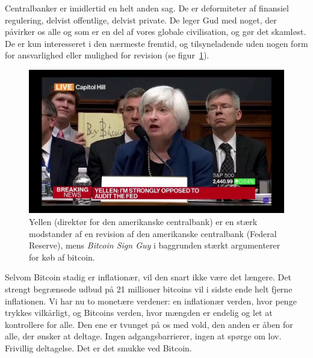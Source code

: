 \documentclass[paper=6in:9in,pagesize=pdftex,
               headinclude=on,footinclude=on,12pt]{scrbook}
\begin{document}
Centralbanker er imidlertid en helt anden sag. De er deformiteter af finansiel regulering, delvist offentlige, delvist private. De leger Gud med noget, der påvirker os alle og som er en del af vores globale civilisation, og gør det skamløst. De er kun interesseret i den nærmeste fremtid, og tilsyneladende uden nogen form for ansvarlighed eller mulighed for revision (se figur~\ref{fig:bsg}).

\begin{figure}
  \centering
  \includegraphics{assets/images/bsg.jpg}
  \caption{Yellen (direktør for den amerikanske centralbank) er en stærk modstander af en revision af den amerikanske centralbank (Federal Reserve), mens \textit{Bitcoin Sign Guy} i baggrunden stærkt argumenterer for køb af bitcoin.}
  \label{fig:bsg}
\end{figure}

Selvom Bitcoin stadig er inflationær, vil den snart ikke være det længere. Det strengt begrænsede udbud på 21 millioner bitcoins vil i sidste ende helt fjerne inflationen. Vi har nu to monetære verdener: en inflationær verden, hvor penge trykkes vilkårligt, og Bitcoins verden, hvor mængden er endelig og let at kontrollere for alle. Den ene er tvunget på os med vold, den anden er åben for alle, der ønsker at deltage. Ingen adgangsbarrierer, ingen at spørge om lov. Frivillig deltagelse. Det er det smukke ved Bitcoin.
\end{document}
